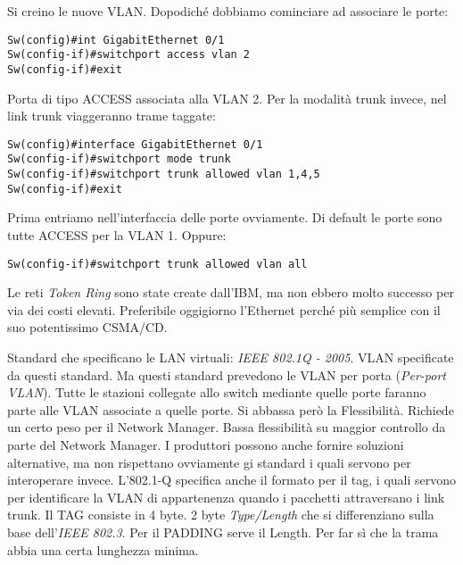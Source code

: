 Si creino le nuove VLAN. Dopodiché dobbiamo cominciare ad associare le porte:

\begin{lstlisting}[language=CISCO]
Sw(config)#int GigabitEthernet 0/1
Sw(config-if)#switchport access vlan 2
Sw(config-if)#exit
\end{lstlisting}

Porta di tipo ACCESS associata alla VLAN 2. Per la modalità trunk invece, nel link trunk viaggeranno trame taggate:

\begin{lstlisting}[language=CISCO]
Sw(config)#interface GigabitEthernet 0/1
Sw(config-if)#switchport mode trunk
Sw(config-if)#switchport trunk allowed vlan 1,4,5
Sw(config-if)#exit
\end{lstlisting}

Prima entriamo nell'interfaccia delle porte ovviamente. Di default le porte sono tutte ACCESS per la VLAN 1. Oppure:

\begin{lstlisting}[language=CISCO]
Sw(config-if)#switchport trunk allowed vlan all
\end{lstlisting}

Le reti \textit{Token Ring} sono state create dall'IBM, ma non ebbero molto successo per via dei costi elevati. Preferibile oggigiorno l'Ethernet perché più semplice con il suo potentissimo CSMA/CD.

Standard che specificano le LAN virtuali: \textit{IEEE 802.1Q - 2005}. VLAN specificate da questi standard. Ma questi standard prevedono le VLAN per porta (\textit{Per-port VLAN}). Tutte le stazioni collegate allo switch mediante quelle porte faranno parte alle VLAN associate a quelle porte. Si abbassa però la Flessibilità. Richiede un certo peso per il Network Manager. Bassa flessibilità su maggior controllo da parte del Network Manager. I produttori possono anche fornire soluzioni alternative, ma non rispettano ovviamente gi standard i quali servono per interoperare invece. L'802.1-Q specifica anche il formato per il tag, i quali servono per identificare la VLAN di appartenenza quando i pacchetti attraversano i link trunk. Il TAG consiste in 4 byte. 2 byte \textit{Type/Length} che si differenziano sulla base dell'\textit{IEEE 802.3}. Per il PADDING serve il Length. Per far sì che la trama abbia una certa lunghezza minima.

